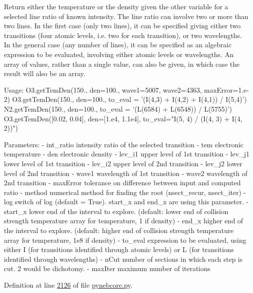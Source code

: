 \begin{DoxyVerb}Return either the temperature or the density given the other variable for a selected line ratio 
    of known intensity.
The line ratio can involve two or more than two lines. 
In the first case (only two lines), it can be specified giving either two transitions 
    (four atomic levels, i.e. two for each transition), or two wavelengths.
In the general case (any number of lines), it can be specified as an algebraic expression 
    to be evaluated, involving either atomic levels or wavelengths.
An array of values, rather than a single value, can also be given, in which case the result 
    will also be an array.
    
Usage: 
    O3.getTemDen(150., den=100., wave1=5007, wave2=4363, maxError=1.e-2)
    O3.getTemDen(150., den=100., to_eval = '(I(4,3) + I(4,2) + I(4,1)) / I(5,4)')
    N2.getTemDen(150., den=100., to_eval = '(L(6584) + L(6548)) / L(5755)')
    O3.getTemDen([0.02, 0.04], den=[1.e4, 1.1e4], to_eval="I(5, 4) / (I(4, 3) + I(4, 2))")

Parameters:
    - int_ratio    intensity ratio of the selected transition
    - tem          electronic temperature
    - den          electronic density
    - lev_i1       upper level of 1st transition
    - lev_j1       lower level of 1st transition
    - lev_i2       upper level of 2nd transition
    - lev_j2       lower level of 2nd transition
    - wave1        wavelength of 1st transition
    - wave2        wavelength of 2nd transition
    - maxError     tolerance on difference between input and computed ratio 
    - method       numerical method for finding the root (nsect_recur, nsect_iter)
    - log          switch of log (default = True). start_x and end_x are using this parameter.
    - start_x      lower end of the interval to explore. (default: lower end of collision 
            strength temperature array for temperature, 1 if density)
    - end_x        higher end of the interval to explore. (default: higher end of collision 
            strength temperature array for temperature, 1e8 if density)
    - to_eval      expression to be evaluated, using either I (for transitions identified 
            through atomic levels) or L (for transitions identified through wavelengths)
    - nCut        number of sections in which each step is cut. 2 would be dichotomy.
    - maxIter     maximum number of iterations\end{DoxyVerb}
 

Definition at line \hyperlink{pynebcore_8py_source_l02126}{2126} of file \hyperlink{pynebcore_8py_source}{pynebcore.\-py}.



